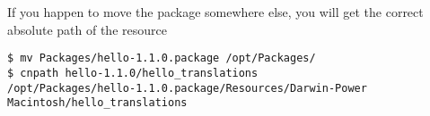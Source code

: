 If you happen to move the package somewhere else, you will get the correct absolute path of the resource

\begin{verbatim}
$ mv Packages/hello-1.1.0.package /opt/Packages/                   
$ cnpath hello-1.1.0/hello_translations
/opt/Packages/hello-1.1.0.package/Resources/Darwin-Power Macintosh/hello_translations
\end{verbatim}

